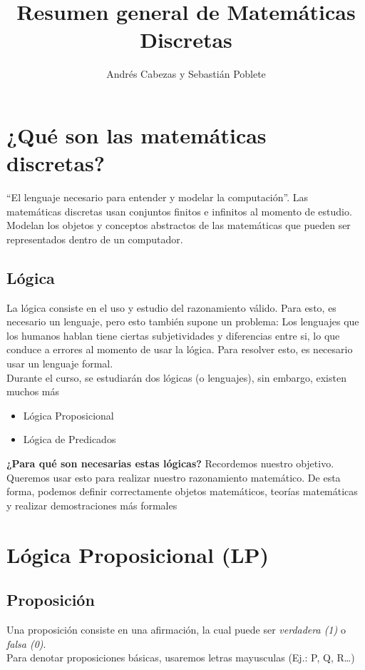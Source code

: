 \documentclass{article}
\title{Resumen general de Matemáticas Discretas}
\author{Andrés Cabezas y Sebastián Poblete}
\begin{document}
\maketitle

\section{¿Qué son las matemáticas discretas?}
``El lenguaje necesario para entender y modelar la computación''. Las matemáticas discretas usan conjuntos finitos e infinitos al momento de estudio. Modelan los objetos y conceptos abstractos de las matemáticas que pueden ser representados dentro de un computador.
\subsection{Lógica}
La lógica consiste en el uso y estudio del razonamiento válido. Para esto, es necesario un lenguaje, pero esto también supone un problema: Los lenguajes que los humanos hablan tiene ciertas subjetividades y diferencias entre si, lo que conduce a errores al momento de usar la lógica. Para resolver esto, es necesario usar un lenguaje formal.\\
Durante el curso, se estudiarán dos lógicas (o lenguajes), sin embargo, existen muchos más
\begin{itemize}
    \item Lógica Proposicional
    \item Lógica de Predicados
\end{itemize}
\textbf{¿Para qué son necesarias estas lógicas?} Recordemos nuestro objetivo. Queremos usar esto para realizar nuestro razonamiento matemático. De esta forma, podemos definir correctamente objetos matemáticos, teorías matemáticas y realizar demostraciones más formales

\section{Lógica Proposicional (LP)}
\subsection{Proposición}
Una proposición consiste en una afirmación, la cual puede ser \textit{verdadera (1)} o \textit{falsa (0)}.\\
Para denotar proposiciones básicas, usaremos letras mayusculas (Ej.: P, Q, R\ldots)
\end{document}
